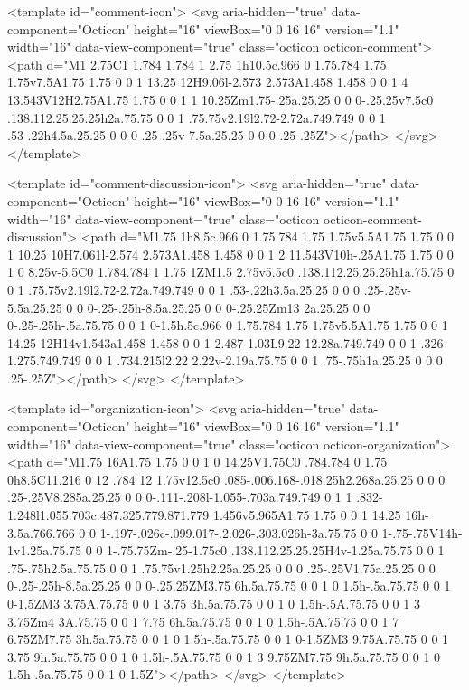 <template id="comment-icon">
  <svg aria-hidden="true" data-component="Octicon" height="16" viewBox="0 0 16 16" version="1.1" width="16" data-view-component="true" class="octicon octicon-comment">
    <path d="M1 2.75C1 1.784 1.784 1 2.75 1h10.5c.966 0 1.75.784 1.75 1.75v7.5A1.75 1.75 0 0 1 13.25 12H9.06l-2.573 2.573A1.458 1.458 0 0 1 4 13.543V12H2.75A1.75 1.75 0 0 1 1 10.25Zm1.75-.25a.25.25 0 0 0-.25.25v7.5c0 .138.112.25.25.25h2a.75.75 0 0 1 .75.75v2.19l2.72-2.72a.749.749 0 0 1 .53-.22h4.5a.25.25 0 0 0 .25-.25v-7.5a.25.25 0 0 0-.25-.25Z"></path>
</svg>
</template>

<template id="comment-discussion-icon">
  <svg aria-hidden="true" data-component="Octicon" height="16" viewBox="0 0 16 16" version="1.1" width="16" data-view-component="true" class="octicon octicon-comment-discussion">
    <path d="M1.75 1h8.5c.966 0 1.75.784 1.75 1.75v5.5A1.75 1.75 0 0 1 10.25 10H7.061l-2.574 2.573A1.458 1.458 0 0 1 2 11.543V10h-.25A1.75 1.75 0 0 1 0 8.25v-5.5C0 1.784.784 1 1.75 1ZM1.5 2.75v5.5c0 .138.112.25.25.25h1a.75.75 0 0 1 .75.75v2.19l2.72-2.72a.749.749 0 0 1 .53-.22h3.5a.25.25 0 0 0 .25-.25v-5.5a.25.25 0 0 0-.25-.25h-8.5a.25.25 0 0 0-.25.25Zm13 2a.25.25 0 0 0-.25-.25h-.5a.75.75 0 0 1 0-1.5h.5c.966 0 1.75.784 1.75 1.75v5.5A1.75 1.75 0 0 1 14.25 12H14v1.543a1.458 1.458 0 0 1-2.487 1.03L9.22 12.28a.749.749 0 0 1 .326-1.275.749.749 0 0 1 .734.215l2.22 2.22v-2.19a.75.75 0 0 1 .75-.75h1a.25.25 0 0 0 .25-.25Z"></path>
</svg>
</template>

<template id="organization-icon">
  <svg aria-hidden="true" data-component="Octicon" height="16" viewBox="0 0 16 16" version="1.1" width="16" data-view-component="true" class="octicon octicon-organization">
    <path d="M1.75 16A1.75 1.75 0 0 1 0 14.25V1.75C0 .784.784 0 1.75 0h8.5C11.216 0 12 .784 12 1.75v12.5c0 .085-.006.168-.018.25h2.268a.25.25 0 0 0 .25-.25V8.285a.25.25 0 0 0-.111-.208l-1.055-.703a.749.749 0 1 1 .832-1.248l1.055.703c.487.325.779.871.779 1.456v5.965A1.75 1.75 0 0 1 14.25 16h-3.5a.766.766 0 0 1-.197-.026c-.099.017-.2.026-.303.026h-3a.75.75 0 0 1-.75-.75V14h-1v1.25a.75.75 0 0 1-.75.75Zm-.25-1.75c0 .138.112.25.25.25H4v-1.25a.75.75 0 0 1 .75-.75h2.5a.75.75 0 0 1 .75.75v1.25h2.25a.25.25 0 0 0 .25-.25V1.75a.25.25 0 0 0-.25-.25h-8.5a.25.25 0 0 0-.25.25ZM3.75 6h.5a.75.75 0 0 1 0 1.5h-.5a.75.75 0 0 1 0-1.5ZM3 3.75A.75.75 0 0 1 3.75 3h.5a.75.75 0 0 1 0 1.5h-.5A.75.75 0 0 1 3 3.75Zm4 3A.75.75 0 0 1 7.75 6h.5a.75.75 0 0 1 0 1.5h-.5A.75.75 0 0 1 7 6.75ZM7.75 3h.5a.75.75 0 0 1 0 1.5h-.5a.75.75 0 0 1 0-1.5ZM3 9.75A.75.75 0 0 1 3.75 9h.5a.75.75 0 0 1 0 1.5h-.5A.75.75 0 0 1 3 9.75ZM7.75 9h.5a.75.75 0 0 1 0 1.5h-.5a.75.75 0 0 1 0-1.5Z"></path>
</svg>
</template>


